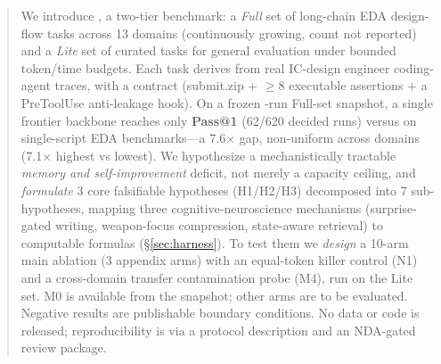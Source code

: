 \begin{abstract}
We introduce \bench{}, a two-tier benchmark: a \emph{Full} set of \FullScale{} long-chain EDA design-flow tasks across 13 domains (continuously growing, count not reported) and a \emph{Lite} set of \LiteSet{} curated tasks for general evaluation under bounded token/time budgets. Each task derives from real IC-design engineer coding-agent traces, with a \mode{} contract (submit.zip + $\geq$8 executable assertions + a PreToolUse anti-leakage hook). On a frozen \Neval{}-run Full-set snapshot, a single frontier backbone reaches only \textbf{\MzeroPass{} Pass@1} (62/620 decided runs) versus \textbf{\ScriptPass{}} on single-script EDA benchmarks---a 7.6$\times$ gap, non-uniform across domains (7.1$\times$ highest vs lowest). We hypothesize a mechanistically tractable \emph{memory and self-improvement} deficit, not merely a capacity ceiling, and \emph{formulate} 3 core falsifiable hypotheses (H1/H2/H3) decomposed into 7 sub-hypotheses, mapping three cognitive-neuroscience mechanisms (surprise-gated writing, weapon-focus compression, state-aware retrieval) to computable formulas (\S\ref{sec:harness}). To test them we \emph{design} a 10-arm main ablation (3 appendix arms) with an equal-token killer control (N1) and a cross-domain transfer contamination probe (M4), run on the Lite set. M0 is available from the snapshot; other arms are to be evaluated. Negative results are publishable boundary conditions. No data or code is released; reproducibility is via a protocol description and an NDA-gated review package.
\end{abstract}

